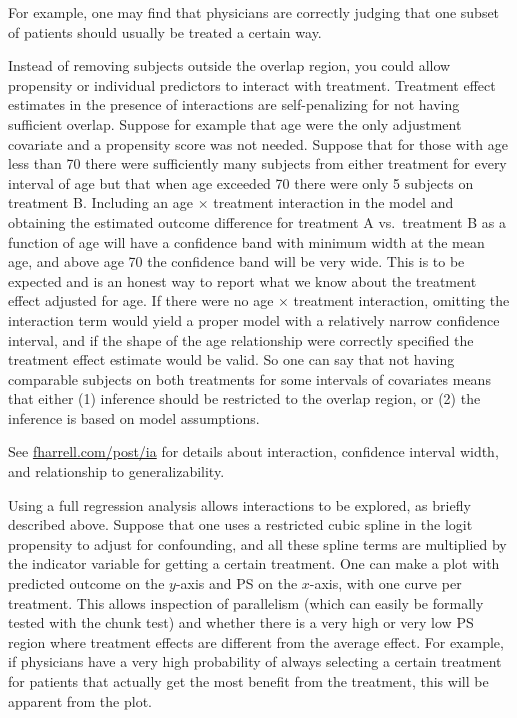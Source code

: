   For example, one may find that physicians are correctly judging that
  one subset of patients should usually be treated a certain way.
\item Instead of removing subjects outside the overlap region, you 
  could allow
  propensity or individual predictors to interact with treatment.
  Treatment effect estimates in the presence of interactions are
  self-penalizing for not having sufficient overlap.  Suppose for
  example that age were the only adjustment covariate and a propensity
  score was not needed.  Suppose that for those with age less than 70
  there were sufficiently many subjects from either treatment for
  every interval of age but that when age exceeded 70 there were only
  5 subjects on treatment B.  Including an age $\times$ treatment
  interaction in the model and obtaining the estimated outcome difference 
  for treatment A vs.\ treatment B as a function of age will have
  a confidence band with minimum width at the mean age, and
  above age 70 the confidence band will be very wide.  This is to be
  expected and is an honest way to report what we know about the
  treatment effect adjusted for age.   If there were no age $\times$
  treatment interaction, omitting the interaction term would yield a
  proper model with a relatively narrow confidence interval, and if
  the shape of the age relationship were correctly specified the
  treatment effect estimate would be valid.  So one can say that not
  having comparable subjects on both treatments for some intervals of
  covariates means that either (1) inference should be restricted to
  the overlap region, or (2) the inference is based on model
  assumptions.
  \item See \href{https://fharrell.com/post/ia}{fharrell.com/post/ia}
    for details about interaction, confidence interval width, and
    relationship to generalizability. 
  \ee

Using a full regression analysis allows interactions to be explored,
as briefly described above.
Suppose that one uses a restricted cubic spline in the logit
propensity to adjust for confounding, and all these spline terms are
multiplied by the indicator variable for getting a certain treatment.
One can make a plot with predicted outcome on the $y$-axis and PS on
the $x$-axis, with one curve per treatment.  This allows inspection of
parallelism (which can easily be formally tested with the chunk test)
and whether there is a very high or very low PS region where treatment
effects are different from the average effect.  For example, if
physicians have a very high probability of always selecting a certain
treatment for patients that actually get the most benefit from the
treatment, this will be apparent from the plot.

